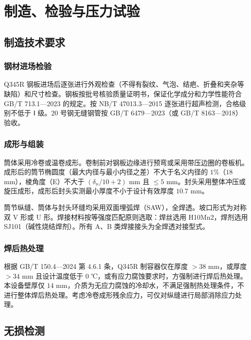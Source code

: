 
\chapter{制造、检验与压力试验}

\section{制造技术要求}

\subsection{钢材进场检验}

Q345R 钢板进场后逐张进行外观检查（不得有裂纹、气泡、结疤、折叠和夹杂等缺陷）和尺寸检查。钢板按批号核验质量证明书，保证化学成分和力学性能符合 GB/T 713.1—2023 的规定\cite{gbt713-1-2023}。按 NB/T 47013.3—2015 逐张进行超声检测，合格级别不低于 Ⅰ 级\cite{nbt47013-2015}。20 号钢无缝钢管按 GB/T 6479—2023\cite{gbt6479-2023}（或 GB/T 8163—2018\cite{gbt8163-2018}）验收。

\subsection{成形与组装}

筒体采用冷卷或温卷成形。卷制前对钢板边缘进行预弯或采用带压边圈的卷板机。成形后的筒节椭圆度（最大内径与最小内径之差）不大于名义内径的 $1\%$（$18$ mm），棱角度（E）不大于 $(\delta_n/10 + 2)$ mm 且 $\le 5$ mm\cite{hgt20584-2020}。封头采用整体冲压或旋压成形，成形后封头实测最小厚度不小于设计有效厚度 $10.7$ mm。

筒节纵缝、筒体与封头环缝均采用双面埋弧焊（SAW），全焊透。坡口形式为对称双 V 形或 U 形。焊接材料按等强度匹配原则选取：焊丝选用 H10Mn2，焊剂选用 SJ101（碱性烧结焊剂）。所有 A、B 类焊接接头为全焊透对接型式。

\subsection{焊后热处理}

根据 GB/T 150.4—2024 第 4.6.1 条\cite{gbt150-2024}，Q345R 制容器仅在厚度 $>38$ mm，或厚度 $>34$ mm 且设计温度低于 $0$ ℃，或有应力腐蚀要求时，方强制进行焊后热处理。本设备壁厚仅 $14$ mm，介质为无应力腐蚀的冷却水，不满足强制热处理条件，不进行整体焊后热处理。考虑冷卷成形残余应力，可仅对纵缝进行局部消除应力处理。

\section{无损检测}

